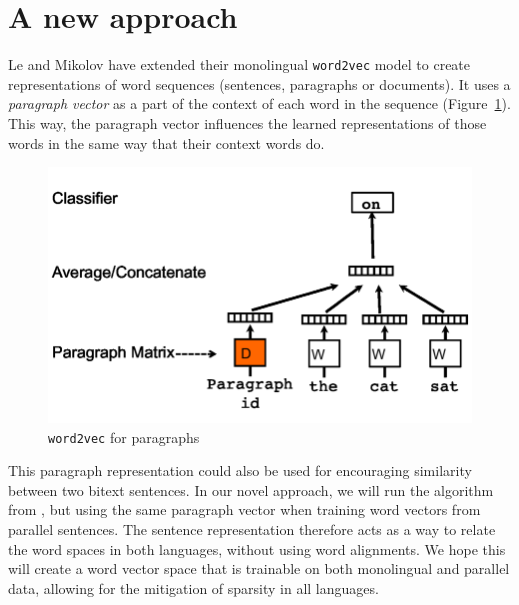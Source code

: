 \documentclass[twocolumn]{article}
\begin{document}



\section{A new approach}\label{s:newApproach}
Le and Mikolov \cite{Le2014} have extended their monolingual \texttt{word2vec} model to create representations of word sequences (sentences, paragraphs or documents).
It uses a \emph{paragraph vector} as a part of the context of each word in the sequence (Figure~\ref{fig:p2v}). 
This way, the paragraph vector influences the learned representations of those words in the same way that their context words do.

\begin{figure}[here]\center
\includegraphics[width=0.7\linewidth]{le.png}
\caption{\texttt{word2vec} for paragraphs}
\label{fig:p2v}
\end{figure}
This paragraph representation could also be used for encouraging similarity between two bitext sentences.
In our novel approach, we will run the algorithm from \cite{Le2014}, but using the same paragraph vector when training word vectors from parallel sentences.
The sentence representation therefore acts as a way to relate the word spaces in both languages, without using word alignments.
We hope this will create a word vector space that is trainable on both monolingual and parallel data, allowing for the mitigation of sparsity in all languages.
\end{document}

